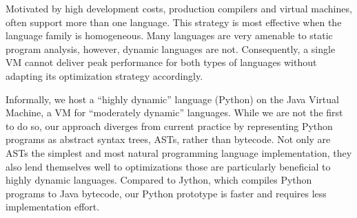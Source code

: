 \thesisabstract
{

Motivated by high development costs, production compilers and virtual machines, often support more than one language.
This strategy is most effective when the language family is homogeneous.
Many languages are very amenable to static program analysis, however, dynamic languages are not.
Consequently, a single VM cannot deliver peak performance for both types of languages without adapting its optimization strategy accordingly.

Informally, we host a ``highly dynamic'' language (Python) on the Java Virtual Machine, a VM for ``moderately dynamic'' languages.
While we are not the first to do so, our approach diverges from current practice by representing Python programs as abstract syntax trees, ASTs, rather than bytecode.
Not only are ASTs the simplest and most natural programming language implementation,
they also lend themselves well to optimizations those are particularly beneficial to highly dynamic languages.
Compared to Jython, which compiles Python programs to Java bytecode, our Python prototype is faster and requires less implementation effort.

}


